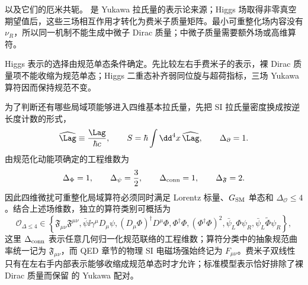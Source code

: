 以及它们的厄米共轭。 是 Yukawa 拉氏量的表示论来源；Higgs 场取得非零真空期望值后，这些三场相互作用才转化为费米子质量矩阵。最小可重整化场内容没有 $\nu_R$，所以同一机制不能生成中微子 Dirac 质量；中微子质量需要额外场或高维算符。


\label{fig:sm-representation-to-yukawa-dp87}
Higgs 表示的选择由规范单态条件确定。先比较左右手费米子的表示，裸 Dirac 质量项不能收缩为规范单态；Higgs 二重态补齐弱同位旋与超荷指标，三场 Yukawa 算符因而保持规范不变。

为了判断还有哪些局域项能够进入四维基本拉氏量，先把 SI 拉氏量密度换成按逆长度计数的形式，
\begin{equation}
 \widehat{\Lag}\equiv\frac{\Lag}{\hbar c},
 \qquad
 S=\hbar\int\dd^4 x\,\widehat{\Lag},
 \qquad \Delta_\partial=1.
 \label{eq:sm-geometric-lagrangian-dp68}
\end{equation}
由规范化动能项确定的工程维数为
\begin{equation}
 {
 \Delta_\Phi=1,\qquad
 \Delta_\psi=\frac32,\qquad
 \Delta_{\rm conn}=1,\qquad
 \Delta_{\mathfrak F}=2.}
 \label{eq:sm-field-engineering-dimensions-dp68}
\end{equation}
因此四维微扰可重整化局域算符必须同时满足 Lorentz 标量、$G_{\rm SM}$ 单态和 $\Delta_{\mathcal O}\le4$。结合上述场维数，独立的算符类别可概括为
\begin{equation}
 {
 \mathcal O_{\Delta\le4}\in
 \left\{
 \mathfrak F_{\mu\nu}\mathfrak F^{\mu\nu},
 \bar\psi\ii\gamma^\mu D_\mu\psi,
 (D_\mu\Phi)^\dagger D^\mu\Phi,
 \Phi^\dagger\Phi,
 (\Phi^\dagger\Phi)^2,
 \bar\psi_L\Phi\psi_R,
 \bar\psi_L\widetilde\Phi\psi_R
 \right\},}
 \label{eq:sm-renormalizable-operator-classes-dp68}
\end{equation}
这里 $\Delta_{\rm conn}$ 表示任意几何归一化规范联络的工程维数；算符分类中的抽象规范曲率统一记为 $\mathfrak F_{\mu\nu}$，而 QED 章节的物理 SI 电磁场强始终记为 $F_{\mu\nu}$。费米子双线性只有在左右手内部表示能够收缩成规范单态时才允许；标准模型表示恰好排除了裸 Dirac 质量而保留 的 Yukawa 配对。


